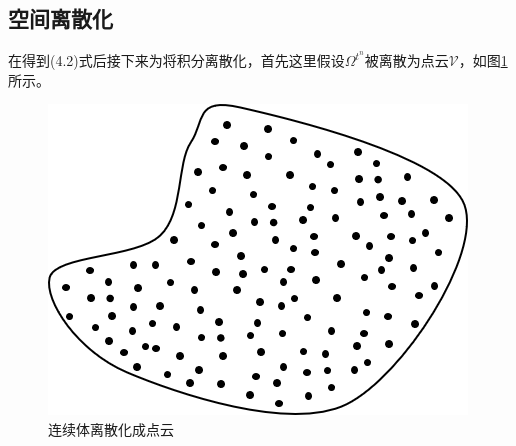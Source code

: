 \subsection{空间离散化}
在得到(4.2)式后接下来为将积分离散化，首先这里假设$\Omega^{t^n}$被离散为点云$\mathcal{V}$，如图\ref{fig: discretise continuum}所示。
\begin{figure}[htbp]
    \centering
    \includegraphics[scale=0.8]{./images/image11.png}
    \caption[连续体离散化]{连续体离散化成点云}
    \label{fig: discretise continuum}
\end{figure}


